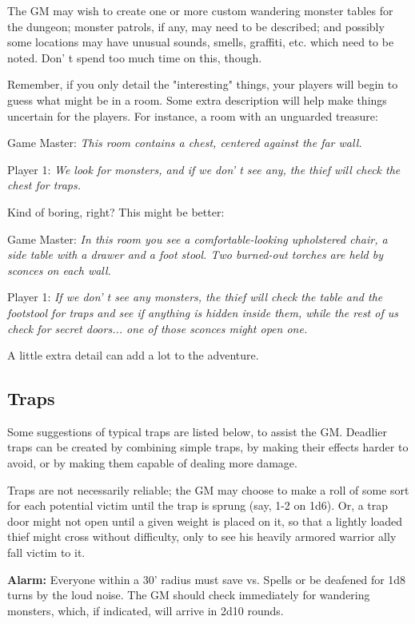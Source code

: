 \documentclass[a4paper,twoside,openany,10pt]{book}
\begin{document}
\begin{multicols}{2}
The GM may wish to create one or more custom wandering monster tables for the dungeon; monster patrols, if any, may need to be described; and possibly some locations may have unusual sounds, smells, graffiti, etc. which need to be noted. Don' t spend too much time on this, though.

Remember, if you only detail the "interesting" things, your players will begin to guess what might be in a room. Some extra description will help make things uncertain for the players. For instance, a room with an unguarded treasure:

Game Master:\emph{ This room contains a chest, centered against the far wall.}

Player 1:\emph{ We look for monsters, and if we don' t see any, the thief will check the chest for traps.}

Kind of boring, right? This might be better:

Game Master: \emph{In this room you see a comfortable-looking upholstered chair, a side table with a drawer and a foot stool. Two burned-out torches are held by sconces on each wall.}

Player 1: \emph{If we don' t see any monsters, the thief will check the table and the footstool for traps and see if anything is hidden inside them, while the rest of us check for secret doors... one of those sconces might open one.}

A little extra detail can add a lot to the adventure.

\subsection{Traps}\label{traps-1}

Some suggestions of typical traps are listed below, to assist the GM. Deadlier traps can be created by combining simple traps, by making their effects harder to avoid, or by making them capable of dealing more damage.

Traps are not necessarily reliable; the GM may choose to make a roll of some sort for each potential victim until the trap is sprung (say, 1-2 on 1d6). Or, a trap door might not open until a given weight is placed on it, so that a lightly loaded thief might cross without difficulty, only to see his heavily armored warrior ally fall victim to it.

\textbf{Alarm:} Everyone within a 30' radius must save vs. Spells or be deafened for 1d8 turns by the loud noise. The GM should check immediately for wandering monsters, which, if indicated, will arrive in 2d10 rounds.


\end{multicols}
\end{document}
